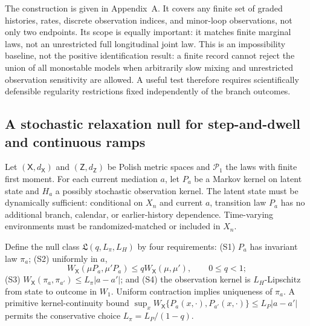 \documentclass[10pt,a4paper]{article}
\begin{document}
The construction is given in Appendix~A. It covers any finite set of graded histories, rates, discrete observation indices, and minor-loop observations, not only two endpoints. Its scope is equally important: it matches finite marginal laws, not an unrestricted full longitudinal joint law. This is an impossibility baseline, not the positive identification result: a finite record cannot reject the union of all monostable models when arbitrarily slow mixing and unrestricted observation sensitivity are allowed. A useful test therefore requires scientifically defensible regularity restrictions fixed independently of the branch outcomes.

\subsection{A stochastic relaxation null for step-and-dwell and continuous ramps}

Let $(\mathsf X,d_{\mathsf X})$ and $(\mathsf Z,d_{\mathsf Z})$ be Polish metric spaces and $\mathcal P_1$ the laws with finite first moment. For each current mediation $a$, let $P_a$ be a Markov kernel on latent state and $H_a$ a possibly stochastic observation kernel. The latent state must be dynamically sufficient: conditional on $X_n$ and current $a$, transition law $P_a$ has no additional branch, calendar, or earlier-history dependence. Time-varying environments must be randomized-matched or included in $X_n$.

Define the null class $\mathfrak L(q,L_\pi,L_H)$ by four requirements: (S1) $P_a$ has invariant law $\pi_a$; (S2) uniformly in $a$,
\begin{equation}
W_{\mathsf X}(\mu P_a,\mu'P_a)\leq qW_{\mathsf X}(\mu,\mu'),\qquad 0\leq q<1;
\label{eq:wasserstein-contraction}
\end{equation}
(S3) $W_{\mathsf X}(\pi_a,\pi_{a'})\leq L_\pi|a-a'|$; and (S4) the observation kernel is $L_H$-Lipschitz from state to outcome in $W_1$. Uniform contraction implies uniqueness of $\pi_a$. A primitive kernel-continuity bound $\sup_xW_{\mathsf X}\{P_a(x,\cdot),P_{a'}(x,\cdot)\}\leq L_P|a-a'|$ permits the conservative choice $L_\pi=L_P/(1-q)$.
\end{document}

